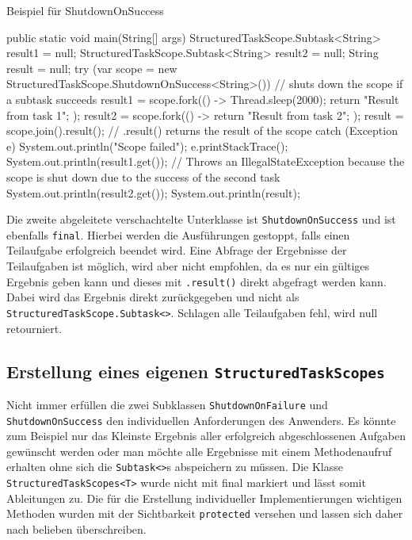     \begin{program} [H]
        \caption{Beispiel für ShutdownOnSuccess}
        \label{prog:BeispielFürShutdownSuccess}
    \begin{JavaCode}[language=Java, numbers=left]
public static void main(String[] args) {
    StructuredTaskScope.Subtask<String> result1 = null;
    StructuredTaskScope.Subtask<String> result2 = null;
    String result = null;
    try (var scope = new StructuredTaskScope.ShutdownOnSuccess<String>()) {                 // shuts down the scope if a subtask succeeds
        result1 = scope.fork(() -> {
            Thread.sleep(2000);
            return "Result from task 1";
        });
        result2 = scope.fork(() -> {
            return "Result from task 2";
        });
        result = scope.join().result();      // .result() returns the result of the scope
    } catch (Exception e) {
        System.out.println("Scope failed");
        e.printStackTrace();
    }
    System.out.println(result1.get());            // Throws an IllegalStateException because the scope is shut down due to the success of the second task
    System.out.println(result2.get());
    System.out.println(result);
}\end{JavaCode}
    \end{program}
    Die zweite abgeleitete verschachtelte Unterklasse ist \texttt{ShutdownOnSuccess} und ist ebenfalls \texttt{final}. Hierbei werden die Ausführungen gestoppt, falls
    einen Teilaufgabe erfolgreich beendet wird. Eine Abfrage der Ergebnisse der Teilaufgaben ist möglich, wird aber nicht empfohlen, da es nur ein gültiges
    Ergebnis geben kann
    und dieses mit \texttt{.result()} direkt abgefragt werden kann. Dabei wird das Ergebnis direkt zurückgegeben und nicht als \texttt{StructuredTaskScope.Subtask<>}.
    Schlagen alle Teilaufgaben fehl, wird null retourniert.



\subsection{Erstellung eines eigenen \texttt{StructuredTaskScopes}}
\label{subsec:ErstellungEinesEigenenSts?}

    Nicht immer erfüllen die zwei Subklassen \texttt{ShutdownOnFailure} und \texttt{ShutdownOnSuccess} den individuellen Anforderungen des Anwenders.
    Es könnte zum Beispiel nur das Kleinste Ergebnis aller erfolgreich abgeschlossenen Aufgaben gewünscht werden oder man möchte alle Ergebnisse mit
    einem Methodenaufruf erhalten ohne sich die \texttt{Subtask<>}s abspeichern zu müssen.
    Die Klasse \texttt{StructuredTaskScopes<T>} wurde nicht mit final markiert und lässt somit Ableitungen zu. Die für die Erstellung individueller Implementierungen wichtigen
    Methoden wurden mit der Sichtbarkeit \texttt{protected} versehen und lassen sich daher nach belieben überschreiben.


